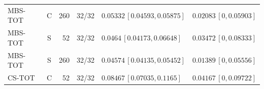 \begin{longtable}{lcrcp{44mm}p{44mm}}
MBS-TOT & C & 260 & 32/32 & \(0.05332\,[0.04593,0.05875]\) & \(0.02083\,[0,0.05903]\)\\
MBS-TOT & S & 52 & 32/32 & \(0.0464\,[0.04173,0.06648]\) & \(0.03472\,[0,0.08333]\)\\
MBS-TOT & S & 260 & 32/32 & \(0.04574\,[0.04135,0.05452]\) & \(0.01389\,[0,0.05556]\)\\
CS-TOT & C & 52 & 32/32 & \(0.08467\,[0.07035,0.1165]\) & \(0.04167\,[0,0.09722]\)\\

\end{longtable}
